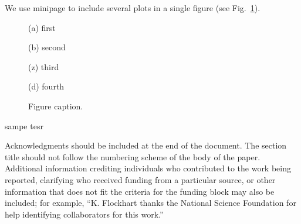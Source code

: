 \documentclass[12pt, a4paper]{article}
\begin{document}
We use minipage to include several plots in a single figure (see Fig.~\ref{potentialZConstGapedCircularSEFig}).

\begin{figure}[h]

	\begin{minipage}[b]{0.24\linewidth}

		
		\caption*{(a) first}

	\end{minipage}
	\begin{minipage}[b]{0.24\linewidth}

		
		\caption*{(b) second}

	\end{minipage}
	\begin{minipage}[b]{0.24\linewidth}
		
		\caption*{(z) third}

	\end{minipage}
	\begin{minipage}[b]{0.24\linewidth}
		
		\caption*{(d) fourth}

	\end{minipage}


	\caption[Potential.]{Figure caption. }

	\label{potentialZConstGapedCircularSEFig}

\end{figure}


sampe tesr

Acknowledgments should be included at the end of the document. The section title should not follow the numbering scheme of the body of the paper. Additional information crediting individuals who contributed to the work being reported, clarifying who received funding from a particular source, or other information that does not fit the criteria for the funding block may also be included; for example, ``K. Flockhart thanks the National Science Foundation for help identifying collaborators for this work.''
\end{document}
